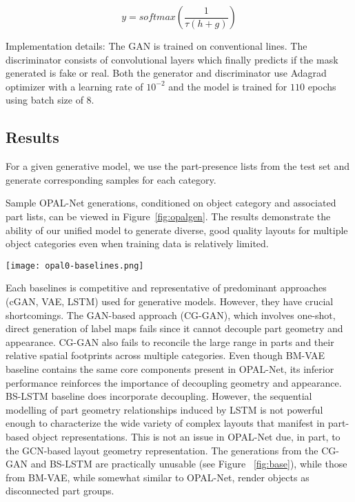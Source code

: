 \documentclass[runningheads]{llncs}
\begin{document}
\begin{equation}
y = softmax(\frac{1}{\tau(h+g)})
\end{equation}

\noindent Implementation details: The GAN is trained on conventional lines. The discriminator consists of convolutional layers which finally predicts if the mask generated is fake or real. Both the generator and discriminator use Adagrad optimizer with a learning rate of $10^{-2}$ and the model is trained for $110$ epochs using batch size of $8$.

\subsection{Results}
\label{sec:results}



For a given generative model, we use the part-presence lists from the test set and generate corresponding samples for each category.

Sample OPAL-Net generations, conditioned on object category and associated part lists, can be viewed in Figure~\ref{fig:opalgen}. The results demonstrate the ability of our unified model to generate diverse, good quality layouts for multiple object categories even when training data is relatively limited.

\begin{figure*}[!ht]
  \centering
  \texttt{[image: opal0-baselines.png]}
  \caption{Sample generations for three object categories from the three baselines described in Section~\ref{sec:baselines} -- BM-VAE, BS-LSTM, CG-GAN. The part presence list for each generation is obtained from a randomly chosen sample in the test set.}
  \label{fig:base}
\end{figure*}

Each baselines is competitive and representative of predominant approaches (cGAN, VAE, LSTM) used for generative models. However, they have crucial shortcomings. The GAN-based approach (CG-GAN), which involves one-shot, direct generation of label maps fails since it cannot decouple part geometry and appearance. CG-GAN also fails to reconcile the large range in parts and their relative spatial footprints across multiple categories. Even though BM-VAE baseline contains the same core components present in OPAL-Net, its inferior performance reinforces the importance of decoupling geometry and appearance. BS-LSTM baseline does incorporate decoupling. However, the sequential modelling of part geometry relationships induced by LSTM is not powerful enough to characterize the wide variety of complex layouts that manifest in part-based object representations. This is not an issue in OPAL-Net due, in part, to the GCN-based layout geometry representation. The generations from the CG-GAN and BS-LSTM are practically unusable (see Figure ~\ref{fig:base}), while those from BM-VAE, while somewhat similar to OPAL-Net, render objects as disconnected part groups.
\end{document}
